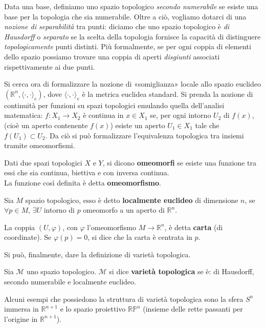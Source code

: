 Data una base, definiamo uno spazio topologico \emph{secondo numerabile} se esiste una base per la topologia che sia numerabile.
Oltre a ciò, vogliamo dotarci di una \emph{nozione di separabilità} tra punti: diciamo che uno spazio topologico è \emph{di Hausdorff} o \emph{separato} se la scelta della topologia fornisce la capacità di distinguere \emph{topologicamente} punti distinti. Più formalmente, se per ogni coppia di elementi dello spazio possiamo trovare una coppia di aperti \emph{disgiunti} associati rispettivamente ai due punti.

Si cerca ora di formalizzare la nozione di «somiglianza» locale allo spazio euclideo $(\mathbb{R}^n, \langle \cdot, \cdot \rangle_e)$, dove $\langle \cdot, \cdot \rangle_e$ è la metrica euclidea standard.
Si prenda la nozione di continuità per funzioni su spazi topologici emulando quella dell'analisi matematica: $f: X_1 \rightarrow X_2$ è continua in $x \in X_1$ se, per ogni intorno $U_2$ di $f(x)$, (cioè un aperto contenente $f(x)$) esiste un aperto $U_1 \in X_1$ tale che $f(U_1) \subset U_2$.
Da ciò si può formalizzare l'equivalenza topologica tra insiemi tramite omeomorfismi.
\begin{definition}
    Dati due spazi topologici $X$ e $Y$, si dicono \textbf{omeomorfi} se esiste una funzione tra essi che sia continua, biettiva e con inversa continua. \\
    La funzione così definita è detta \textbf{omeomorfismo}.
\end{definition}
\begin{definition}
    Sia $M$ spazio topologico, esso è detto \textbf{localmente euclideo} di dimensione $n$, se $\forall p \in M$, $\exists U $ intorno di $p$ omeomorfo a un aperto di $\mathbb{R}^n$.
\end{definition}
\begin{definition}
    La coppia $(U, \varphi)$, con $\varphi$ l'omeomorfismo $M \rightarrow \mathbb{R}^n$, è detta \textbf{carta} (di coordinate).
    Se $\varphi(p) = 0$, si dice che la carta è centrata in $p$.
\end{definition}
Si può, finalmente, dare la definizione di varietà topologica.
\begin{definition}
    Sia $\mathcal{M}$ uno spazio topologico. $\mathcal{M}$ si dice \textbf{varietà topologica} se è: di Hausdorff, secondo numerabile e localmente euclideo.
\end{definition}
Alcuni esempi che possiedono la struttura di varietà topologica sono la sfera $S^n$ immersa in $\mathbb{R}^{n+1}$ e lo spazio proiettivo $\mathbb{RP}^n$ (insieme delle rette passanti per l'origine in $\mathbb{R}^{n+1}$).

